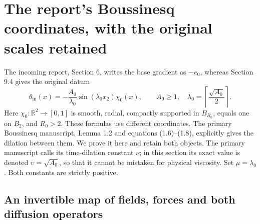 \section{The report's Boussinesq coordinates, with the original scales retained}
\label{sec:wba-bouss-scales}

The incoming report, Section 6, writes the base gradient as $-e_0$,
whereas Section 9.4 gives the original datum
\begin{equation}\label{eq:wba-original-datum}
 \theta_{\mathrm{in}}(x)=-\frac{A_0}{\lambda_0}
 \sin(\lambda_0x_2)\chi_0(x),\qquad
 A_0\geq1,\quad\lambda_0=\left\lceil\frac{\sqrt{A_0}}2\right\rceil.
\end{equation}
Here $\chi_0:\mathbb R^2\to[0,1]$ is smooth, radial, compactly supported
in $B_{R_0}$, equals one on $B_2$, and $R_0>2$.
These formulas use different coordinates. The primary Boussinesq manuscript,
Lemma 1.2 and equations (1.6)--(1.8), explicitly gives the dilation between
them. We prove it here and retain both objects. The primary manuscript calls
its time-dilation constant $\nu$; in this section its exact value is denoted
$\upsilon=\sqrt{A_0}$, so that it cannot be mistaken for physical viscosity.
Set $\mu=\lambda_0$. Both constants are strictly positive.

\subsection{An invertible map of fields, forces and both diffusion operators}

